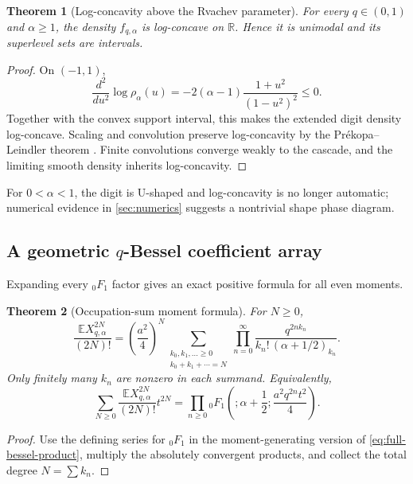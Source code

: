 \documentclass[11pt]{article}
\newtheorem{theorem}{Theorem}[section]
\theoremstyle{definition}
\theoremstyle{remark}
\newcommand{\R}{\mathbb{R}}
\newcommand{\E}{\mathbb{E}}
\newcommand{\poch}[2]{\left(#1\right)_{#2}}
\begin{document}
\begin{theorem}[Log-concavity above the Rvachev parameter]
\label{thm:log-concavity}
For every \(q\in(0,1)\) and \(\alpha\ge1\), the density
\(f_{q,\alpha}\) is log-concave on \(\R\).  Hence it is unimodal and its
superlevel sets are intervals.
\end{theorem}

\begin{proof}
On \((-1,1)\),
\[
 \frac{d^2}{du^2}\log\rho_\alpha(u)
 =-2(\alpha-1)\frac{1+u^2}{(1-u^2)^2}\le0.
\]
Together with the convex support interval, this makes the extended digit
density log-concave.  Scaling and convolution preserve log-concavity by the
Pr\'ekopa--Leindler theorem \cite{Prekopa}.  Finite convolutions converge weakly to the
cascade, and the limiting smooth density inherits log-concavity.
\end{proof}

For \(0<\alpha<1\), the digit is U-shaped and log-concavity is no longer
automatic; numerical evidence in \cref{sec:numerics} suggests a nontrivial
shape phase diagram.

\subsection{A geometric \(q\)-Bessel coefficient array}

Expanding every \({}_0F_1\) factor gives an exact positive formula for all
even moments.

\begin{theorem}[Occupation-sum moment formula]
\label{thm:occupation-sum}
For \(N\ge0\),
\begin{equation}
 \frac{\E X_{q,\alpha}^{2N}}{(2N)!}
 =\left(\frac{a^2}{4}\right)^N
 \sum_{\substack{k_0,k_1,\ldots\ge0\\k_0+k_1+\cdots=N}}
 \prod_{n=0}^{\infty}
 \frac{q^{2nk_n}}{k_n!\,\poch{\alpha+1/2}{k_n}}.
 \label{eq:occupation-moment}
\end{equation}
Only finitely many \(k_n\) are nonzero in each summand.  Equivalently,
\begin{equation}
 \sum_{N\ge0}\frac{\E X_{q,\alpha}^{2N}}{(2N)!}t^{2N}
 =\prod_{n\ge0}{}_0F_1\left(;\alpha+\frac12;
 \frac{a^2q^{2n}t^2}{4}\right).
 \label{eq:mgf-hypergeometric-product}
\end{equation}
\end{theorem}

\begin{proof}
Use the defining series for \({}_0F_1\) in the moment-generating version of
\eqref{eq:full-bessel-product}, multiply the absolutely convergent products,
and collect the total degree \(N=\sum k_n\).
\end{proof}
\end{document}
